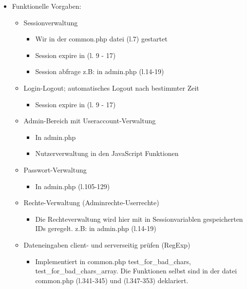 \documentclass{article}
\begin{document}
\begin{itemize}
    \item Funktionelle Vorgaben:
    \begin{itemize}
        \item Sessionverwaltung
            \begin{itemize}
                \item Wir in der common.php datei (l.7) gestartet
                \item Session expire in (l. 9 - 17)
                \item Session abfrage z.B: in admin.php (l.14-19)
            \end{itemize}
        \item Login-Logout; automatisches Logout nach bestimmter Zeit\\
            \begin{itemize}
                \item Session expire in (l. 9 - 17) 
            \end{itemize}
        \item Admin-Bereich mit Useraccount-Verwaltung\\
            \begin{itemize}
                \item In admin.php
                \item Nutzerverwaltung in den JavaScript Funktionen 
            \end{itemize}
        \item Passwort-Verwaltung\\
            \begin{itemize}
                \item In admin.php (l.105-129)
            \end{itemize}
        \item Rechte-Verwaltung (Adminrechte-Userrechte)\\
            \begin{itemize}
                \item Die Rechteverwaltung wird hier mit in Sessionvariablen gespeicherten IDs geregelt.
                z.B: in admin.php (l.14-19)
            \end{itemize}
        \item Dateneingaben client- und serverseitig prüfen (RegExp)\\
            \begin{itemize}
                \item Implementiert in common.php test\_for\_bad\_chars, \newline test\_for\_bad\_chars\_array. Die Funktionen selbst sind in der datei common.php (l.341-345) und (l.347-353) deklariert.

\end{itemize}
\end{itemize}
\end{itemize}
\end{document}
